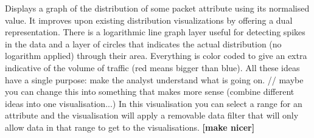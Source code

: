 Displays a graph of the distribution of some packet attribute using its normalised value.
It improves upon existing distribution visualizations by offering a dual representation.
There is a logarithmic line graph layer useful for detecting spikes in the data and a layer of circles that indicates the actual distribution (no logarithm applied) through their area. 
Everything is color coded to give an extra indicative of the volume of traffic (red means bigger than blue).
All these ideas have a single purpose: make the analyst understand what is going on. // maybe you can change this into something that makes more sense (combine different ideas into one visualisation...)
In this visualisation you can select a range for an attribute and the visualisation will apply a removable data filter that will only allow data in that range to get to the visualisations.
\textbf{[make nicer]}
